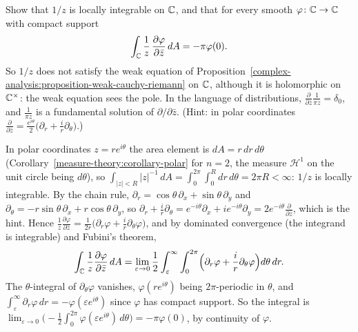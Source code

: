 \begin{exercise}\label{complex-analysis:exercise-cauchy-kernel-dbar}
Show that $1/z$ is locally integrable on $\mathbb{C}$, and that for every smooth $\varphi \colon \mathbb{C} \to \mathbb{C}$ with compact support
\[
\int_{\mathbb{C}}\frac1z\,\frac{\partial\varphi}{\partial\bar z}\,dA = -\pi\varphi(0).
\]
So $1/z$ does not satisfy the weak equation of Proposition~\ref{complex-analysis:proposition-weak-cauchy-riemann} on $\mathbb{C}$, although it is holomorphic on $\mathbb{C}^\times$: the weak equation sees the pole. In the language of
distributions, $\frac{\partial}{\partial\bar z}\frac{1}{\pi z} = \delta_0$, and $\frac1{\pi z}$ is a fundamental solution of $\partial/\partial\bar z$. (Hint: in polar coordinates
$\frac{\partial}{\partial\bar z} = \frac{e^{i\theta}}{2}\bigl(\partial_r + \frac ir\partial_\theta\bigr)$.)
\end{exercise}

\begin{solution}
In polar coordinates $z = re^{i\theta}$ the area element is $dA = r\,dr\,d\theta$ (Corollary~\ref{measure-theory:corollary-polar} for $n = 2$, the measure $\mathcal{H}^1$ on the unit circle being $d\theta$), so
$\int_{|z| < R}|z|^{-1}\,dA = \int_0^{2\pi}\int_0^R dr\,d\theta = 2\pi R < \infty$: $1/z$ is locally integrable. By the chain rule, $\partial_r = \cos\theta\,\partial_x + \sin\theta\,\partial_y$ and
$\partial_\theta = -r\sin\theta\,\partial_x + r\cos\theta\,\partial_y$, so $\partial_r + \frac ir\partial_\theta = e^{-i\theta}\partial_x + ie^{-i\theta}\partial_y = 2e^{-i\theta}\frac{\partial}{\partial\bar z}$, which is the hint.
Hence $\frac1z\frac{\partial\varphi}{\partial\bar z} = \frac{1}{2r}\bigl(\partial_r\varphi + \frac ir\partial_\theta\varphi\bigr)$, and by dominated convergence (the integrand is integrable) and Fubini's theorem,
\[
\int_{\mathbb{C}}\frac1z\frac{\partial\varphi}{\partial\bar z}\,dA = \lim_{\varepsilon \to 0}\frac12\int_\varepsilon^\infty\int_0^{2\pi}\Bigl(\partial_r\varphi + \frac ir\partial_\theta\varphi\Bigr)d\theta\,dr .
\]
The $\theta$-integral of $\partial_\theta\varphi$ vanishes, $\varphi(re^{i\theta})$ being $2\pi$-periodic in $\theta$, and $\int_\varepsilon^\infty\partial_r\varphi\,dr = -\varphi(\varepsilon e^{i\theta})$ since $\varphi$ has compact support.
So the integral is $\lim_{\varepsilon \to 0}\bigl(-\frac12\int_0^{2\pi}\varphi(\varepsilon e^{i\theta})\,d\theta\bigr) = -\pi\varphi(0)$, by continuity of $\varphi$.
\end{solution}
